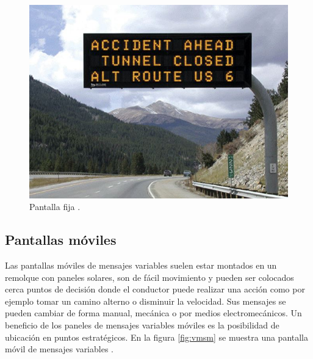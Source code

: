 \begin{figure}[htpb]
	\centering
	\includegraphics[width=.9 \textwidth]{../Figures/vmspermanente.jpg} 
	\caption{Pantalla fija \protect\footnotemark.}
	\label{fig:vmsp}
\end{figure}






\subsection{Pantallas móviles}

Las pantallas móviles de mensajes variables suelen estar montados en un remolque con paneles solares, son de fácil movimiento y pueden ser colocados cerca puntos de decisión donde el conductor puede realizar una acción como por ejemplo tomar un camino alterno o disminuir la velocidad. Sus mensajes se pueden cambiar de forma manual, mecánica o por medios electromecánicos. Un beneficio de los paneles de mensajes variables móviles es la posibilidad de ubicación en puntos estratégicos. En la figura \ref{fig:vmsm} se muestra una pantalla móvil de mensajes variables \citep{VMSTYPES}.

